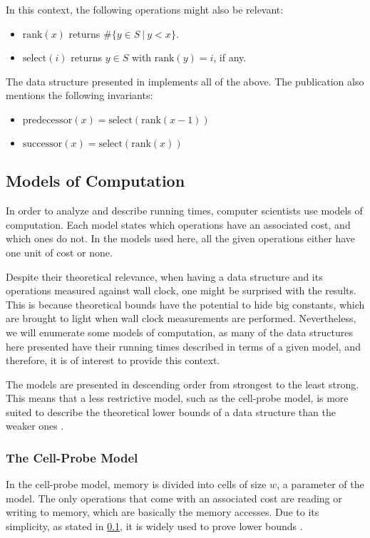 In this context, the following operations might also be relevant:
\begin{itemize}
    \item
    $\text{rank}(x)$ returns $\#\{ y \in S\ |\ y < x\}$.
    \item
    $\text{select}(i)$ returns $y \in S$ with $\text{rank}(y) = i$, if any.
\end{itemize}

The data structure presented in \cite{patrascu2014dynamic} implements all of the above. The publication also mentions the following invariants:
\begin{itemize}
    \item
    $\text{predecessor}(x) = \text{select}(\text{rank}(x - 1))$
    \item
    $\text{successor}(x) = \text{select}(\text{rank}(x))$
\end{itemize}

\subsection{Models of Computation}\label{sec:modelsofcomputation}

In order to analyze and describe running times, computer scientists use models of computation. Each model states which operations have an associated cost, and which ones do not.
In the models used here, all the given operations either have one unit of cost or none.

Despite their theoretical relevance, when having a data structure and its operations measured against wall clock, one might be surprised with the results.
This is because theoretical bounds have the potential to hide big constants, which are brought to light when wall clock measurements are performed.
Nevertheless, we will enumerate some models of computation, as many of the data structures here presented have their running times described in terms of a given model, and therefore, it is of interest to provide this context.

The models are presented in descending order from strongest to the least strong. This means that a less restrictive model, such as the cell-probe model, is more suited to describe the theoretical lower bounds of a data structure than the weaker ones \cite{erikdemainelec11}.

\subsubsection{The Cell-Probe Model}
In the cell-probe model, memory is divided into cells of size $w$, a parameter of the model.
The only operations that come with an associated cost are reading or writing to memory, which are basically the memory accesses.
Due to its simplicity, as stated in \ref{sec:modelsofcomputation}, it is widely used to prove lower bounds \cite{erikdemainelec11}.

